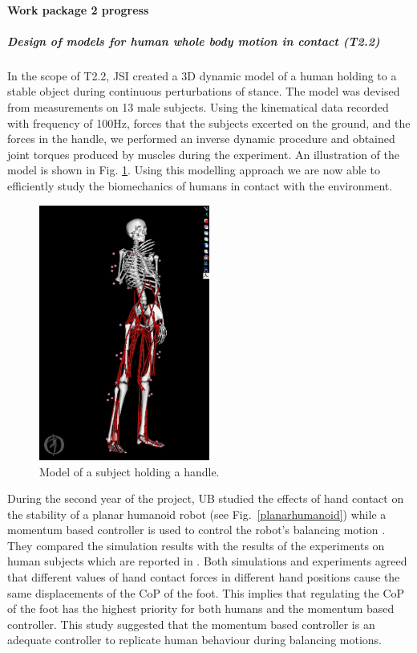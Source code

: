 \paragraph{Work package 2 progress}


\subparagraph{Design of models for human whole body motion in contact (T2.2)}
In the scope of T2.2, JSI created a 3D dynamic model of a human holding to a stable object during continuous perturbations of stance. The model was devised from measurements on 13 male subjects. Using the kinematical data recorded with frequency of 100Hz, forces that the subjects excerted on the ground, and the forces in the handle, we performed an inverse dynamic procedure and obtained joint torques produced by muscles during the experiment. An illustration of the model is shown in Fig. \ref{fig:skeleton}. Using this modelling approach we are now able to efficiently study the biomechanics of humans in contact with the environment.

\begin{figure}[!t]
	\begin{center}
		\includegraphics[width=0.5\textwidth]{images/skeleton_v1.png}
		\caption{Model of a subject holding a handle.}
		\label{fig:skeleton}
	\end{center}
\end{figure}


During the second year of the project, UB studied the effects of hand contact
on the stability of a planar humanoid robot (see Fig.~\ref{planarhumanoid})
while a momentum based controller is used to control the robot's balancing
motion \cite{Azad2014}. They compared the simulation results with the
results of the experiments on human subjects which are reported in
\cite{Babic2014}. Both simulations and experiments agreed that different
values of hand contact forces in different hand positions cause the same
displacements of the CoP of the foot. This implies that regulating the CoP of
the foot has the highest priority for both humans and the momentum based
controller.  This study suggested that the momentum based controller is an
adequate controller to replicate human behaviour during balancing motions.

